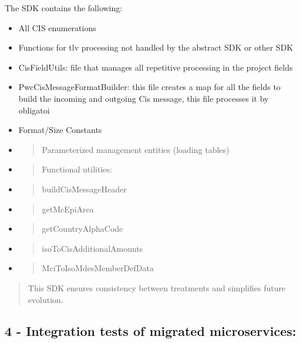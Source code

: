 \documentclass[12pt,a4paper]{report}
\begin{document}
The SDK contains the following:

\begin{itemize}
\item
  All CIS enumerations
\item
  Functions for tlv processing not handled by the abstract SDK or other
  SDK
\item
  CisFieldUtils: file that manages all repetitive processing in the
  project fields
\item
  PwcCisMessageFormatBuilder: this file creates a map for all the fields
  to build the incoming and outgoing Cis message, this file processes it
  by obligatoi
\item
  Format/Size Constants
\item
  \begin{quote}
  Parameterized management entities (loading tables)
  \end{quote}
\item
  \begin{quote}
  Functional utilities:
  \end{quote}
\item
  \begin{quote}
  buildCisMessageHeader
  \end{quote}
\item
  \begin{quote}
  getMcEpiArea
  \end{quote}
\end{itemize}

\begin{itemize}
\item
  \begin{quote}
  getCountryAlphaCode
  \end{quote}
\item
  \begin{quote}
  isoToCisAdditionalAmounts
  \end{quote}
\item
  \begin{quote}
  MciToIsoMdesMemberDefData
  \end{quote}
\end{itemize}

\begin{quote}
This SDK ensures consistency between treatments and simplifies future
evolution.
\end{quote}


\subsection{4 - Integration tests of migrated
microservices:}
\end{document}
